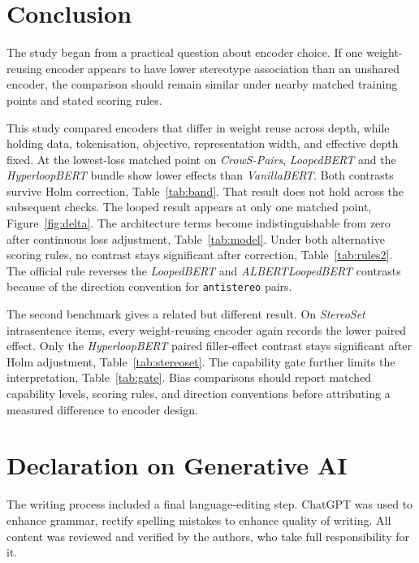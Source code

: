 \documentclass[sigconf,natbib=true,anonymous=true]{acmart}
\begin{document}
\section{Conclusion}
\label{sec:conclusion}

The study began from a practical question about encoder choice. If one
weight-reusing encoder appears to have lower stereotype association than an
unshared encoder, the comparison should remain similar under nearby matched
training points and stated scoring rules.

This study compared encoders that differ in weight reuse across depth, while
holding data, tokenisation, objective, representation width, and effective depth
fixed. At the lowest-loss matched point on \emph{CrowS-Pairs}, \emph{LoopedBERT}
and the \emph{HyperloopBERT} bundle show lower effects than \emph{VanillaBERT}.
Both contrasts survive Holm correction, Table~\ref{tab:band}. That result does
not hold across the subsequent checks. The looped result appears at only one
matched point, Figure~\ref{fig:delta}. The architecture terms become
indistinguishable from zero after continuous loss adjustment,
Table~\ref{tab:model}. Under both alternative scoring rules, no contrast stays
significant after correction, Table~\ref{tab:rules2}. The official rule reverses
the \emph{LoopedBERT} and \emph{ALBERTLoopedBERT} contrasts because of the
direction convention for \texttt{antistereo} pairs.

The second benchmark gives a related but different result. On \emph{StereoSet}
intrasentence items, every weight-reusing encoder again records the lower
paired effect. Only
the \emph{HyperloopBERT} paired filler-effect contrast stays significant after
Holm adjustment, Table~\ref{tab:stereoset}. The capability gate further limits the interpretation, Table~\ref{tab:gate}. Bias comparisons should report matched capability levels,
scoring rules, and direction conventions before attributing a measured
difference to encoder design.

\section*{Declaration on Generative AI}

The writing process included a final language-editing step. ChatGPT was used to
enhance grammar, rectify spelling mistakes to enhance quality of writing. All content
was reviewed and verified by the authors, who take full responsibility for it.



\end{document}
